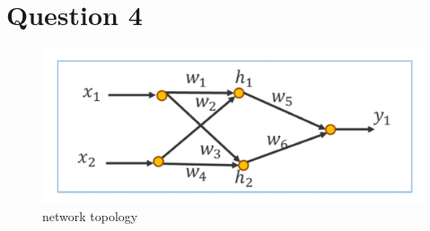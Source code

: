 \documentclass[a4paper, article, oneside, USenglish, IN5460]{memoir}
\begin{document}
\chapter{Question 4}

\begin{figure}[H]
\centering
\includegraphics[width=0.8\linewidth]{fig/q4.png}
\caption{\label{fig:q4} \neural network topology}
\end{figure}
\end{document}
